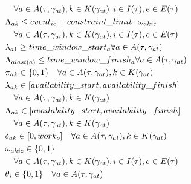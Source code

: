 \begin{alignat}{2}
	& \quad \forall a \in A(\tau, \gamma_{at}), k \in K(\gamma_{at}), i \in I(\tau), e \in E(\tau)                                \\
	& \Lambda_{ak} \leq event_{ie} + constraint\_limit \cdot \omega_{akie}                                                                      \notag\\ 
	& \quad \forall a \in A(\tau, \gamma_{at}), k \in K(\gamma_{at}), i \in I(\tau), e \in E(\tau)                                \\
	& \lambda_{a1} \geq time\_window\_start_{a} \forall a \in A(\tau, \gamma_{at})                                                          \\
	& \Lambda_{alast(a)} \leq time\_window\_finish_{a} \forall a \in A(\tau, \gamma_{at})                                                  \\
	& \pi_{ak} \in \{0, 1\} \quad \forall a \in A(\tau, \gamma_{at}), k \in K(\gamma_{at})                                          \\
	& \lambda_{ak} \in [availability\_start, availability\_finish] \notag\\
	& \quad \forall a \in A(\tau, \gamma_{at}), k \in K(\gamma_{at})  \\
	& \Lambda_{ak} \in [availability\_start, availability\_finish] \notag\\
	& \quad \forall a \in A(\tau, \gamma_{at}), k \in K(\gamma_{at}) \\
	& \delta_{ak} \in [0, work_{o}] \quad \forall a \in A(\tau, \gamma_{at}), k \in K(\gamma_{at})                                               \\
	& \omega_{akie} \in \{0, 1\}                                                                                                                              \\ 
	& \quad \forall a \in A(\tau, \gamma_{at}), k \in K(\gamma_{at}), i \in I(\tau), e \in E(\tau) \notag                               \\
	& \theta_i \in \{0, 1\} \quad \forall a \in A(\tau, \gamma_{at})                                                                                \\
\end{alignat}
